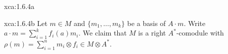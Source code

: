 \begin{sol}{xca:1.6.4a}
\end{sol}

\begin{sol}{xca:1.6.4b}
Let $m\in M$ and $\{m_1,\dots,m_k\}$ be a basis of $A\cdot m$. Write 
$a\cdot m=\sum_{i=1}^kf_i(a)m_i$. We claim that 
$M$ is a right $A^*$-comodule with 
$\rho(m)=\sum_{i=1}^n m_i\otimes f_i\in M\otimes A^*$. 
\end{sol}
